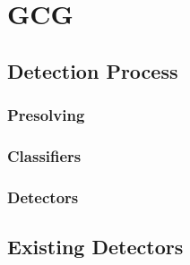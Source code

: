 \chapter{GCG}

	\section{Detection Process}
	
		\subsection{Presolving}
	
		\subsection{Classifiers}
		
		\subsection{Detectors}
	
	\section{Existing Detectors}
